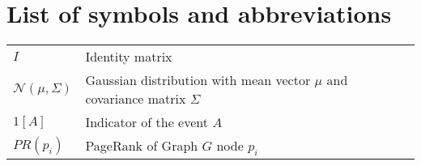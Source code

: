 

\chapter*{List of symbols and abbreviations}

\begin{tabularx}{0.9\textwidth}{lX}
    $I$ & Identity matrix \\
    $\mathcal{N}(\mu, \Sigma)$ & Gaussian distribution with mean vector $\mu$ and covariance matrix $\Sigma$\\
    $1\left[A\right]$ & Indicator of the event $A$ \\
    $PR(p_i)$ & PageRank of Graph $G$ node $p_i$ \\
\end{tabularx}